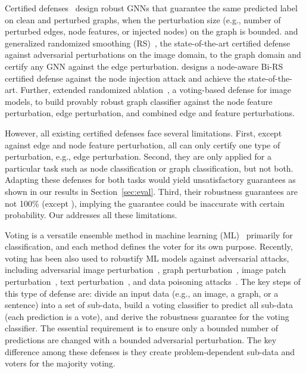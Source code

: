 Certified defenses~\cite{jin2020certified,jia2020certified,bojchevski2020efficient,wang2021certified,xia2024gnncert,lai2023nodeawarebismoothingcertifiedrobustness} design robust GNNs that guarantee the same predicted label on clean and perturbed graphs, when the perturbation size (e.g., number of perturbed edges, node features, or injected nodes) on the graph is bounded. 
\cite{bojchevski2020efficient} and~\cite{wang2021certified} generalized randomized smoothing (RS)~\cite{lecuyer2019certified,cohen2019certified,hong2022unicr}, the state-of-the-art certified defense against adversarial perturbations on the image domain, to the graph domain and certify any GNN against the edge perturbation. \cite{lai2023nodeawarebismoothingcertifiedrobustness} designs a node-aware Bi-RS certified defense against the node injection attack and achieve the state-of-the-art. 
Further, \cite{xia2024gnncert} extended randomized ablation~\cite{levine2020robustness}, a voting-based defense for image models, to build provably robust graph classifier against the node feature perturbation, edge perturbation, and combined edge and feature perturbations.   

However, all existing certified defenses face several  limitations. First, except \cite{xia2024gnncert} against edge and node feature perturbation, all can only 
certify 
one type of perturbation, e.g., edge perturbation. 
Second, they are only applied 
for a particular task such as node classification or graph classification, but not both. Adapting these defenses for both tasks would yield unsatisfactory guarantees as shown in our results in Section~\ref{sec:eval}. 
Third, their robustness guarantees are not 100\% (except \cite{xia2024gnncert}), implying  the guarantee could be inaccurate with certain probability. Our {\name} addresses all these limitations. 



\vspace{+0.05in}
Voting is a versatile ensemble method in machine learning (ML)~\cite{dietterich2000ensemble} primarily for classification, and each method defines the voter for its own purpose. 
Recently, voting has been also used to robustify ML models against adversarial attacks, including adversarial image perturbation~\cite{levine2020deep},  graph perturbation~\cite{xia2024gnncert,yang2024distributed,li2025provably}, image patch perturbation~\cite{levine2020randomized,xiang2021patchguard}, text perturbation~\cite{pei2023textguard,zhang2024text}, and data poisoning attacks~\cite{jia2021intrinsic,jia2022certified}.
The key steps of this type of defense are: divide an input data (e.g., an image, a graph, or a sentence) into a set of sub-data, build a voting classifier to predict all sub-data (each prediction is a vote), and derive the robustness guarantee for the voting classifier. 
The essential requirement is to ensure only a bounded number of predictions are changed with a bounded adversarial perturbation. 
The key difference among these defenses is they create problem-dependent sub-data and voters for the majority voting.